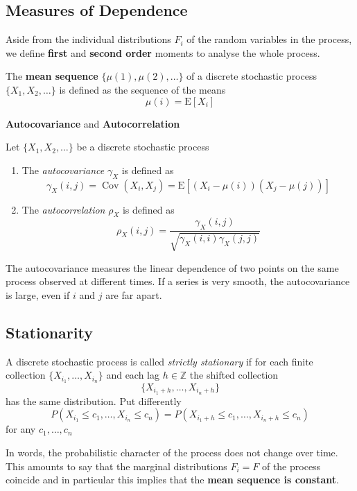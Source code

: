 \documentclass[11pt]{article}
\newcommand*\ev[1]{\mathrel{\text{E}\left[#1\right]}}
\newcommand*\Z{\mathbb{Z}}
\newcommand*\Cov[1]{\mathop{\text{Cov}}\left(#1\right)}
\begin{document}
\subsection{Measures of Dependence}
Aside from the individual distributions $F_i$ of the random variables in the process, we define \textbf{first} and \textbf{second order} moments to analyse the whole process.
\begin{definition}
	The \textbf{mean sequence} $\{\mu(1),\mu(2), \dots\}$ of a discrete stochastic process\\
	$\{X_1, X_2, \dots\}$ is defined as the sequence of the means
	\begin{equation*}
		\mu(i) = \ev{X_i}
	\end{equation*}
\end{definition}

\noindent
\textbf{Autocovariance} and \textbf{Autocorrelation}
\begin{definition}
	Let $\{X_1, X_2, \dots\}$ be a discrete stochastic process
	\begin{enumerate}
		\item The \emph{autocovariance} $\gamma_X$ is defined as
		\begin{equation*}
			\gamma_X(i,j) = \Cov{X_i,X_j} = \ev{(X_i - \mu(i))(X_j - \mu(j))}
		\end{equation*}
		\item The \emph{autocorrelation} $\rho_X$ is defined as
		\begin{equation*}
			\rho_X(i,j) = \frac{\gamma_X(i,j)}{\sqrt{\gamma_X(i,i)\gamma_X(j,j)}}
		\end{equation*}
	\end{enumerate}
\end{definition}
The autocovariance measures the linear dependence of two points on the same process observed at different times. If a series is very smooth, the autocovariance is large, even if $i$ and $j$ are far apart.

\clearpage
\subsection{Stationarity}
\begin{definition}
	A discrete stochastic process is called \emph{strictly stationary} if for each finite collection $\{X_{i_1}, \dots, X_{i_n}\}$ and each lag $h\in\Z$ the shifted collection
	\begin{equation*}
		\{X_{i_1+h}, \dots, X_{i_n+h}\}
	\end{equation*}
	has the same distribution. Put differently
	\begin{equation*}
		P(X_{i_1}\leq c_1, \dots, X_{i_n}\leq c_n) = P(X_{i_1+h}\leq c_1, \dots, X_{i_n+h}\leq c_n)
	\end{equation*}
	for any $c_1,\dots,c_n$
\end{definition}
In words, the probabilistic character of the process does not change over time. This amounts to say that the marginal distributions $F_i = F$ of the process coincide and in particular this implies that the \textbf{mean sequence is constant}.
\end{document}
